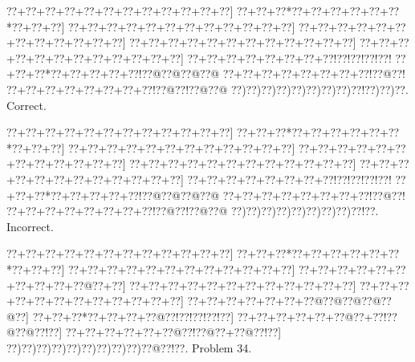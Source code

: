 \documentclass[a5paper]{article}
\begin{document}
\begin{center}
{\goo
\0??+\0??+\0??+\0??+\0??+\0??+\0??+\0??+\0??+\0??+\0??+\0??]
\0??+\0??+\0??*\0??+\0??+\0??+\0??+\0??+\0??*\0??+\0??+\0??]
\0??+\0??+\0??+\0??+\0??+\0??+\0??+\0??+\0??+\0??+\0??+\0??]
\0??+\0??+\0??+\0??+\0??+\0??+\0??+\0??+\0??+\0??+\0??+\0??]
\0??+\0??+\0??+\0??+\0??+\0??+\0??+\0??+\0??+\0??+\0??+\0??]
\0??+\0??+\0??+\0??+\0??+\0??+\0??+\0??+\0??+\0??+\0??+\0??]
\0??+\0??+\0??+\0??+\0??+\0??+\0??+\0??!\0??!\0??!\0??!\0??!
\0??+\0??+\0??*\0??+\0??+\0??+\0??+\0??!\0??@\0??@\0??@\0??@
\0??+\0??+\0??+\0??+\0??+\0??+\0??+\0??!\0??@\0??!
\0??+\0??+\0??+\0??+\0??+\0??+\0??+\0??!\0??@\0??!\0??@\0??@
\0??)\0??)\0??)\0??)\0??)\0??)\0??)\0??)\0??!\0??)\0??)\0??.
}
Correct. 

\end{center}
\begin{center}
{\goo
\0??+\0??+\0??+\0??+\0??+\0??+\0??+\0??+\0??+\0??+\0??+\0??]
\0??+\0??+\0??*\0??+\0??+\0??+\0??+\0??+\0??*\0??+\0??+\0??]
\0??+\0??+\0??+\0??+\0??+\0??+\0??+\0??+\0??+\0??+\0??+\0??]
\0??+\0??+\0??+\0??+\0??+\0??+\0??+\0??+\0??+\0??+\0??+\0??]
\0??+\0??+\0??+\0??+\0??+\0??+\0??+\0??+\0??+\0??+\0??+\0??]
\0??+\0??+\0??+\0??+\0??+\0??+\0??+\0??+\0??+\0??+\0??+\0??]
\0??+\0??+\0??+\0??+\0??+\0??+\0??+\0??!\0??!\0??!\0??!\0??!
\0??+\0??+\0??*\0??+\0??+\0??+\0??+\0??!\0??@\0??@\0??@\0??@
\0??+\0??+\0??+\0??+\0??+\0??+\0??+\0??!\0??@\0??!
\0??+\0??+\0??+\0??+\0??+\0??+\0??+\0??!\0??@\0??!\0??@\0??@
\0??)\0??)\0??)\0??)\0??)\0??)\0??)\0??)\0??!\0??.
}
Incorrect. 

\end{center}
\newpage
\begin{center}
{\goo
\0??+\0??+\0??+\0??+\0??+\0??+\0??+\0??+\0??+\0??+\0??+\0??]
\0??+\0??+\0??*\0??+\0??+\0??+\0??+\0??+\0??*\0??+\0??+\0??]
\0??+\0??+\0??+\0??+\0??+\0??+\0??+\0??+\0??+\0??+\0??+\0??]
\0??+\0??+\0??+\0??+\0??+\0??+\0??+\0??+\0??+\0??@\0??+\0??]
\0??+\0??+\0??+\0??+\0??+\0??+\0??+\0??+\0??+\0??+\0??+\0??]
\0??+\0??+\0??+\0??+\0??+\0??+\0??+\0??+\0??+\0??+\0??+\0??]
\0??+\0??+\0??+\0??+\0??+\0??+\0??@\0??@\0??@\0??@\0??@\0??]
\0??+\0??+\0??*\0??+\0??+\0??+\0??@\0??!\0??!\0??!\0??!\0??]
\0??+\0??+\0??+\0??+\0??+\0??@\0??+\0??!\0??@\0??@\0??!\0??]
\0??+\0??+\0??+\0??+\0??+\0??@\0??!\0??@\0??+\0??@\0??!\0??]
\0??)\0??)\0??)\0??)\0??)\0??)\0??)\0??)\0??)\0??@\0??!\0??.
}
Problem 34.

\end{center}
\end{document}
